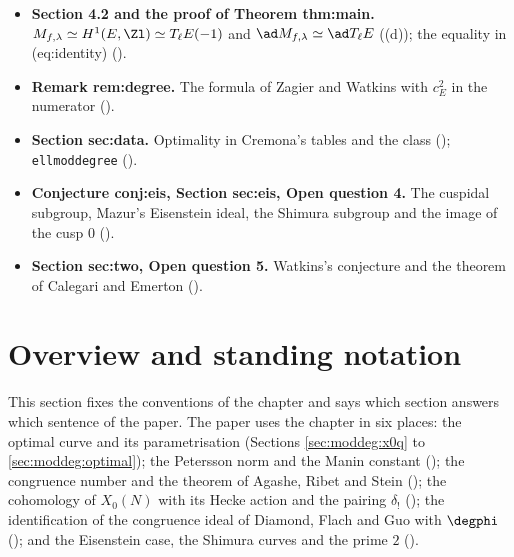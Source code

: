 \begin{itemize}
$T_\ell J_0(N)$ with $H^1(X_0(N),\Zl)$ as Hecke modules ().
\item \textbf{Section 4.2 and the proof of Theorem thm:main.} $M_{f,\lambda}\simeq H^1(E,\Zl)\simeq T_\ell E(-1)$ and $\ad M_{f,\lambda}\simeq\ad T_\ell E$
((d)); the equality in (eq:identity) ().
\item \textbf{Remark rem:degree.} The formula of Zagier and Watkins with $c_E^2$ in the numerator ().
\item \textbf{Section sec:data.} Optimality in Cremona's tables and the class  (); \texttt{ellmoddegree}
().
\item \textbf{Conjecture conj:eis, Section sec:eis, Open question 4.} The cuspidal subgroup, Mazur's Eisenstein ideal, the Shimura subgroup and
the image of the cusp $0$ ().
\item \textbf{Section sec:two, Open question 5.} Watkins's conjecture and the theorem of Calegari and Emerton ().
\end{itemize}

\section{Overview and standing notation}\label{sec:moddeg:overview}

This section fixes the conventions of the chapter and says which section answers which sentence of the paper. The paper
uses the chapter in six places: the optimal curve and its parametrisation (Sections \ref{sec:moddeg:x0q} to \ref{sec:moddeg:optimal}); the
Petersson norm and the Manin constant (); the congruence number and the theorem of Agashe, Ribet and Stein
(); the cohomology of $X_0(N)$ with its Hecke action and the pairing $\hat\delta_!$ ();
the identification of the congruence ideal of Diamond, Flach and Guo with $\degphi$ (); and the Eisenstein
case, the Shimura curves and the prime $2$ ().

